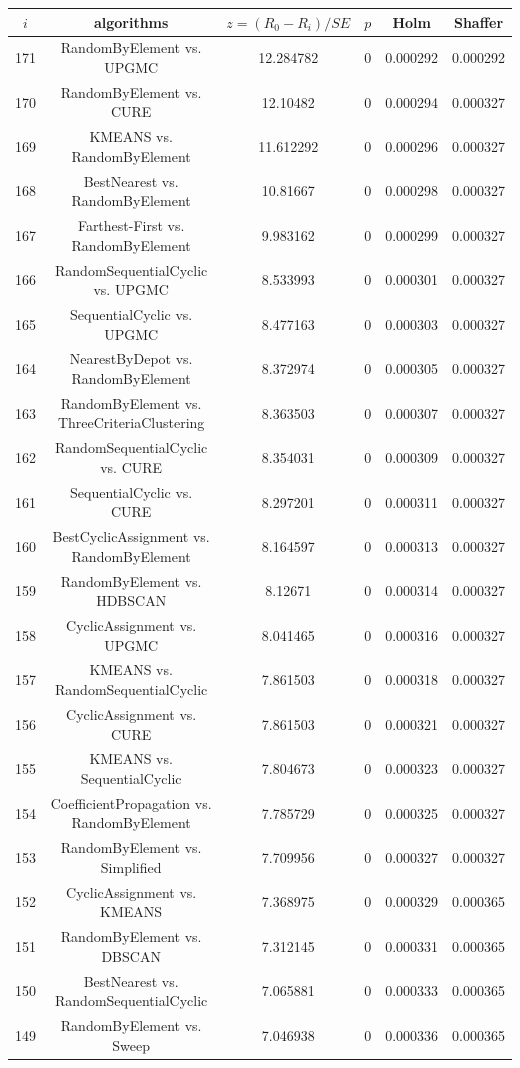 \documentclass[a4paper,10pt]{article}
\begin{document}
\begin{landscape}
\begin{table}[!htp]
\centering\scriptsize
\begin{tabular}{cccccc}
$i$&algorithms&$z=(R_0 - R_i)/SE$&$p$&Holm&Shaffer\\
\hline171&RandomByElement vs. UPGMC&12.284782&0&0.000292&0.000292\\
170&RandomByElement vs. CURE&12.10482&0&0.000294&0.000327\\
169&KMEANS vs. RandomByElement&11.612292&0&0.000296&0.000327\\
168&BestNearest vs. RandomByElement&10.81667&0&0.000298&0.000327\\
167&Farthest-First vs. RandomByElement&9.983162&0&0.000299&0.000327\\
166&RandomSequentialCyclic vs. UPGMC&8.533993&0&0.000301&0.000327\\
165&SequentialCyclic vs. UPGMC&8.477163&0&0.000303&0.000327\\
164&NearestByDepot vs. RandomByElement&8.372974&0&0.000305&0.000327\\
163&RandomByElement vs. ThreeCriteriaClustering&8.363503&0&0.000307&0.000327\\
162&RandomSequentialCyclic vs. CURE&8.354031&0&0.000309&0.000327\\
161&SequentialCyclic vs. CURE&8.297201&0&0.000311&0.000327\\
160&BestCyclicAssignment vs. RandomByElement&8.164597&0&0.000313&0.000327\\
159&RandomByElement vs. HDBSCAN&8.12671&0&0.000314&0.000327\\
158&CyclicAssignment vs. UPGMC&8.041465&0&0.000316&0.000327\\
157&KMEANS vs. RandomSequentialCyclic&7.861503&0&0.000318&0.000327\\
156&CyclicAssignment vs. CURE&7.861503&0&0.000321&0.000327\\
155&KMEANS vs. SequentialCyclic&7.804673&0&0.000323&0.000327\\
154&CoefficientPropagation vs. RandomByElement&7.785729&0&0.000325&0.000327\\
153&RandomByElement vs. Simplified&7.709956&0&0.000327&0.000327\\
152&CyclicAssignment vs. KMEANS&7.368975&0&0.000329&0.000365\\
151&RandomByElement vs. DBSCAN&7.312145&0&0.000331&0.000365\\
150&BestNearest vs. RandomSequentialCyclic&7.065881&0&0.000333&0.000365\\
149&RandomByElement vs. Sweep&7.046938&0&0.000336&0.000365\\

\end{tabular}
\end{table}
\end{landscape}
\end{document}
